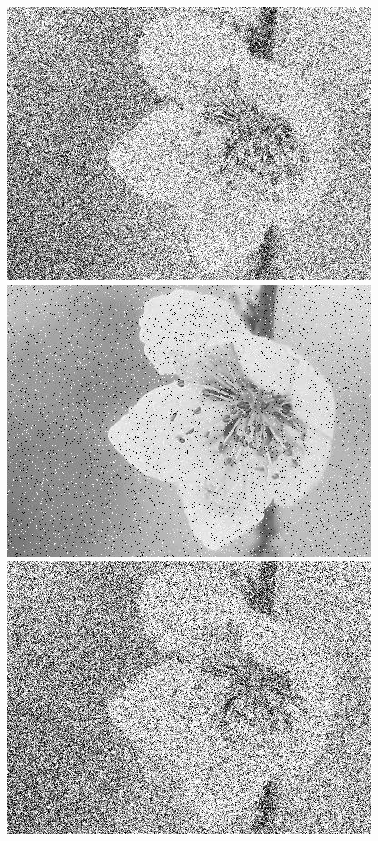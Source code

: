 \documentclass[10pt,aspectratio=43,mathserif]{beamer}
\begin{document}
\begin{frame}
\begin{columns}
\includegraphics[scale=0.2]{exp-1.jpg}
\includegraphics[scale=0.2]{exp-5.jpg}
\includegraphics[scale=0.2]{exp-9.jpg}


\end{columns}
\end{frame}
\end{document}
